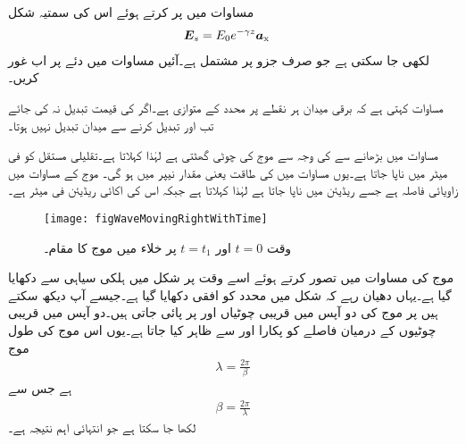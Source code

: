 مساوات  میں  پر کرتے ہوئے اس کی سمتیہ شکل  
\begin{align}\label{مساوات_موج_مثبت_زیڈ_جانب_سمتی}
{\ensuremath{{\boldsymbol{E}}}}_s&=E_0 e^{-\gamma z} {\boldsymbol{a}}_{\textup{x}}
\end{align}
لکھی جا سکتی ہے جو صرف  جزو پر مشتمل ہے۔آئیں مساوات  میں دئے   پر اب غور کریں۔

مساوات  کہتی ہے کہ برقی میدان ہر نقطے پر  محدد کے متوازی ہے۔اگر  کی قیمت تبدیل نہ کی جائے تب  اور  تبدیل کرنے سے میدان تبدیل نہیں ہوتا۔

مساوات  میں  بڑھانے سے  کی وجہ سے موج کی چوٹی گھٹتی ہے لہٰذا   کہلاتا ہے۔تقلیلی مستقل کو  فی میٹر  میں ناپا جاتا ہے۔یوں مساوات  میں  کی طاقت یعنی   مقدار  نیپر  میں ہو گی۔ موج کے مساوات میں  زاویائی فاصلہ ہے جسے ریڈیئن میں ناپا جاتا ہے  لہٰذا   کہلاتا ہے جبکہ اس کی اکائی ریڈیئن فی
 میٹر  ہے۔  

\begin{figure}
\centering
\texttt{[image: figWaveMovingRightWithTime]}
\caption{وقت $t=0$ اور $t=t_1$ پر خلاء میں موج کا مقام۔}
\label{شکل_موج_وقت_کے_ساتھ_مثبت_چلتی_موج}
\end{figure}


موج کی مساوات  میں  تصور کرتے ہوئے اسے وقت  پر شکل  میں ہلکی سیاہی سے دکھایا گیا ہے۔یہاں دھیان رہے کہ شکل میں  محدد کو افقی دکھایا گیا ہے۔جیسے آپ دیکھ سکتے ہیں  پر موج کی دو آپس میں قریبی چوٹیاں  اور  پر پائی جاتی ہیں۔دو آپس میں قریبی چوٹیوں کے درمیان فاصلے کو  پکارا اور  سے ظاہر کیا جاتا ہے۔یوں اس موج کی طول موج
\begin{align}\label{مساوات_موج_زاویائی_مستقل_اور_طول_موج_الف}
\lambda=\frac{2\pi}{\beta}
\end{align}
ہے جس سے
\begin{align}\label{مساوات_موج_زاویائی_مستقل_اور_طول_موج_ب}
\beta=\frac{2\pi}{\lambda}
\end{align}
لکھا جا سکتا ہے جو انتہائی اہم نتیجہ ہے۔

